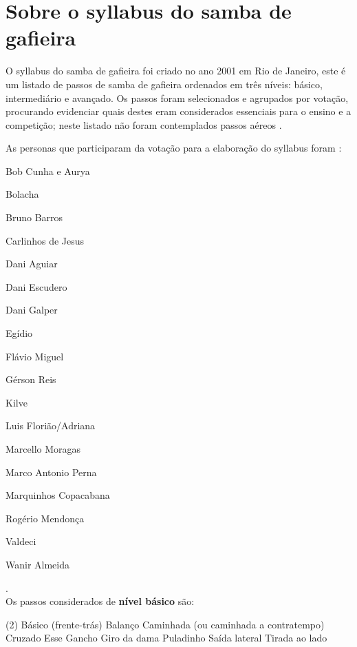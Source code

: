 \section{Sobre o syllabus do samba de gafieira}

O syllabus do samba de gafieira foi criado no ano 2001 em Rio de Janeiro,
este é um listado de passos de samba de gafieira ordenados em três níveis: básico, intermediário e avançado.
Os passos foram selecionados e agrupados por votação, 
procurando evidenciar quais destes eram 
considerados essenciais para o ensino e a competição;
neste listado não foram contemplados passos aéreos \cite[pp. 144]{perna2002samba}.


As personas que participaram da votação para a elaboração do syllabus foram \cite[pp. 144]{perna2002samba}:
\begin{inparaitem}[$*$]
\item Bob Cunha e Aurya
\item Bolacha
\item Bruno Barros
\item Carlinhos de Jesus
\item Dani Aguiar
\item Dani Escudero
\item Dani Galper
\item Egídio
\item Flávio Miguel
\item Gérson Reis
\item Kilve
\item Luis Florião/Adriana
\item Marcello Moragas
\item Marco Antonio Perna
\item Marquinhos Copacabana
\item Rogério Mendonça
\item Valdeci
\item Wanir Almeida
\end{inparaitem}.\\



Os passos considerados de \textbf{nível básico} são:
\begin{tasks}(2)
\task Básico (frente-trás)
\task Balanço 
\task Caminhada (ou caminhada a contratempo)
\task Cruzado
\task Esse
\task Gancho
\task Giro da dama
\task Puladinho
\task Saída lateral
\task Tirada ao lado
\end{tasks}~\\


